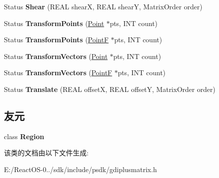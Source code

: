 \begin{DoxyCompactItemize}
Status {\bfseries Shear} (R\+E\+AL shearX, R\+E\+AL shearY, Matrix\+Order order)
\item 
\mbox{\label{class_matrix_a697ad7f2d628db337849cbc18cb9732d}} 
Status {\bfseries Transform\+Points} (\hyperlink{struct_point}{Point} $\ast$pts, I\+NT count)
\item 
\mbox{\label{class_matrix_a628208a22a69fd8fe21e906ba6b9fc16}} 
Status {\bfseries Transform\+Points} (\hyperlink{struct_point_f}{PointF} $\ast$pts, I\+NT count)
\item 
\mbox{\label{class_matrix_a3f8a2d694f71f4f75e07b76bc864a9af}} 
Status {\bfseries Transform\+Vectors} (\hyperlink{struct_point}{Point} $\ast$pts, I\+NT count)
\item 
\mbox{\label{class_matrix_a47e8fc421c64bb64fb9f177f36f9123c}} 
Status {\bfseries Transform\+Vectors} (\hyperlink{struct_point_f}{PointF} $\ast$pts, I\+NT count)
\item 
\mbox{\label{class_matrix_a1e1fe240bf313f2b673ff7b20c2d6da5}} 
Status {\bfseries Translate} (R\+E\+AL offsetX, R\+E\+AL offsetY, Matrix\+Order order)
\end{DoxyCompactItemize}
\subsection*{友元}
\begin{DoxyCompactItemize}
\item 
\mbox{\label{class_matrix_aae6f9325706131f3b6fb8accb1508d76}} 
class {\bfseries Region}
\end{DoxyCompactItemize}


该类的文档由以下文件生成\+:\begin{DoxyCompactItemize}
\item 
E\+:/\+React\+O\+S-\/0../sdk/include/psdk/gdiplusmatrix.\+h\end{DoxyCompactItemize}
